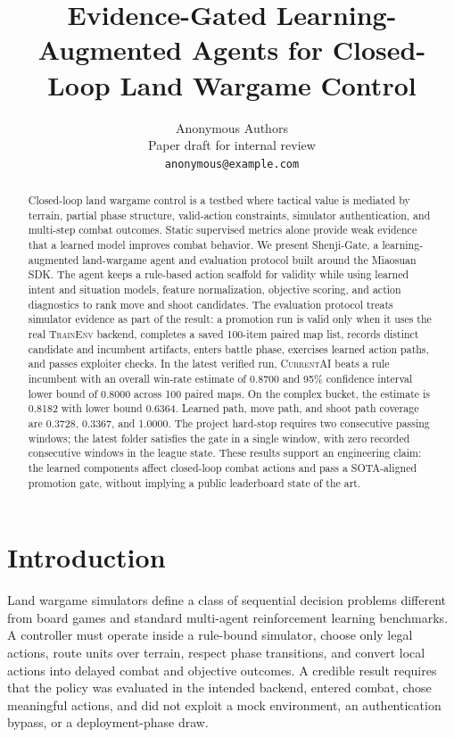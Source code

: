 \documentclass{article}
\title{Evidence-Gated Learning-Augmented Agents for Closed-Loop Land Wargame Control}
\author{
  Anonymous Authors \\
  Paper draft for internal review \\
  \texttt{anonymous@example.com}
}
\newcommand{\method}{Shenji-Gate}
\newcommand{\env}{\textsc{TrainEnv}}
\newcommand{\currentai}{\textsc{CurrentAI}}
\begin{document}
\maketitle

\begin{abstract}
Closed-loop land wargame control is a testbed where tactical value is mediated by terrain, partial phase structure, valid-action constraints, simulator authentication, and multi-step combat outcomes. Static supervised metrics alone provide weak evidence that a learned model improves combat behavior. We present \method, a learning-augmented land-wargame agent and evaluation protocol built around the Miaosuan SDK. The agent keeps a rule-based action scaffold for validity while using learned intent and situation models, feature normalization, objective scoring, and action diagnostics to rank move and shoot candidates. The evaluation protocol treats simulator evidence as part of the result: a promotion run is valid only when it uses the real \env{} backend, completes a saved 100-item paired map list, records distinct candidate and incumbent artifacts, enters battle phase, exercises learned action paths, and passes exploiter checks. In the latest verified run, \currentai{} beats a rule incumbent with an overall win-rate estimate of 0.8700 and 95\% confidence interval lower bound of 0.8000 across 100 paired maps. On the complex bucket, the estimate is 0.8182 with lower bound 0.6364. Learned path, move path, and shoot path coverage are 0.3728, 0.3367, and 1.0000. The project hard-stop requires two consecutive passing windows; the latest folder satisfies the gate in a single window, with zero recorded consecutive windows in the league state. These results support an engineering claim: the learned components affect closed-loop combat actions and pass a SOTA-aligned promotion gate, without implying a public leaderboard state of the art.
\end{abstract}

\section{Introduction}

Land wargame simulators define a class of sequential decision problems different from board games and standard multi-agent reinforcement learning benchmarks. A controller must operate inside a rule-bound simulator, choose only legal actions, route units over terrain, respect phase transitions, and convert local actions into delayed combat and objective outcomes. A credible result requires that the policy was evaluated in the intended backend, entered combat, chose meaningful actions, and did not exploit a mock environment, an authentication bypass, or a deployment-phase draw.
\end{document}
